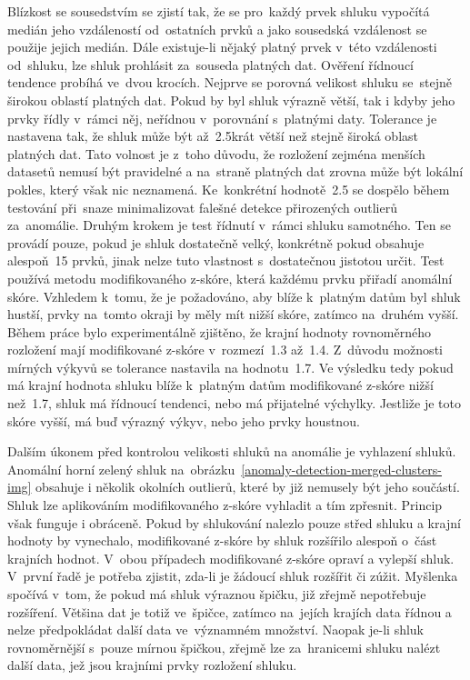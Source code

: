 Blízkost se sousedstvím se zjistí tak, že se pro~každý prvek shluku vypočítá medián jeho vzdáleností od~ostatních prvků a jako sousedská vzdálenost se použije jejich medián. Dále existuje-li nějaký platný prvek v~této vzdálenosti od~shluku, lze shluk prohlásit za~souseda platných dat. Ověření řídnoucí tendence probíhá ve~dvou krocích. Nejprve se porovná velikost shluku se~stejně širokou oblastí platných dat. Pokud by byl shluk výrazně větší, tak i kdyby jeho prvky řídly v~rámci něj, neřídnou v~porovnání s~platnými daty. Tolerance je nastavena tak, že shluk může být až~2.5krát větší než stejně široká oblast platných dat. Tato volnost je z~toho důvodu, že rozložení zejména menších datasetů nemusí být pravidelné a na~straně platných dat zrovna může být lokální pokles, který však nic neznamená. Ke~konkrétní hodnotě~2.5 se dospělo během testování při~snaze minimalizovat falešné detekce přirozených outlierů za~anomálie. Druhým krokem je test řídnutí v~rámci shluku samotného. Ten se provádí pouze, pokud je shluk dostatečně velký, konkrétně pokud obsahuje alespoň~15 prvků, jinak nelze tuto vlastnost s~dostatečnou jistotou určit. Test používá metodu modifikovaného z-skóre, která každému prvku přiřadí anomální skóre. Vzhledem k~tomu, že je požadováno, aby blíže k~platným datům byl shluk hustší, prvky na~tomto okraji by měly mít nižší skóre, zatímco na~druhém vyšší. Během práce bylo experimentálně zjištěno, že krajní hodnoty rovnoměrného rozložení mají modifikované z-skóre v~rozmezí~1.3 až~1.4. Z~důvodu možnosti mírných výkyvů se tolerance nastavila na hodnotu~1.7. Ve výsledku tedy pokud má krajní hodnota shluku blíže k~platným datům modifikované z-skóre nižší než~1.7, shluk má řídnoucí tendenci, nebo má přijatelné výchylky. Jestliže je toto skóre vyšší, má buď výrazný výkyv, nebo jeho prvky houstnou.

Dalším úkonem před kontrolou velikosti shluků na anomálie je vyhlazení shluků. Anomální horní zelený shluk na~obrázku~\ref{anomaly-detection-merged-clusters-img} obsahuje i několik okolních outlierů, které by již nemusely být jeho součástí. Shluk lze aplikováním modifikovaného z-skóre vyhladit a tím zpřesnit. Princip však funguje i obráceně. Pokud by shlukování nalezlo pouze střed shluku a krajní hodnoty by vynechalo, modifikované z-skóre by shluk rozšířilo alespoň o~část krajních hodnot. V~obou případech modifikované z-skóre opraví a vylepší shluk. V~první řadě je potřeba zjistit, zda-li je žádoucí shluk rozšířit či zúžit. Myšlenka spočívá v~tom, že pokud má shluk výraznou špičku, již zřejmě nepotřebuje rozšíření. Většina dat je totiž ve~špičce, zatímco na~jejích krajích data řídnou a nelze předpokládat další data ve~významném množství. Naopak je-li shluk rovnoměrnější s~pouze mírnou špičkou, zřejmě lze za~hranicemi shluku nalézt další data, jež jsou krajními prvky rozložení shluku.

